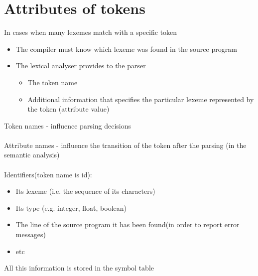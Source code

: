 \documentclass{article}[18pt]
\begin{document}
\section{Attributes of tokens}
In cases when many lexemes match with a specific token
\begin{itemize}
	\item The compiler must know which lexeme was found in the source program
	\item The lexical analyser provides to the parser
	\begin{itemize}
		\item The token name
		\item Additional information that specifies the particular lexeme represented by the token (attribute value)
	\end{itemize}
\end{itemize}
Token names - influence parsing decisions\\
\\
Attribute names - influence the transition of the token after the parsing (in the semantic analysis)\\
\\
Identifiers(token name is id):
\begin{itemize}
	\item Its lexeme (i.e. the sequence of its characters)
	\item Its type (e.g. integer, float, boolean)
	\item The line of the source program it has been found(in order to report error messages)
	\item etc
\end{itemize}
All this information is stored in the symbol table
\end{document}
